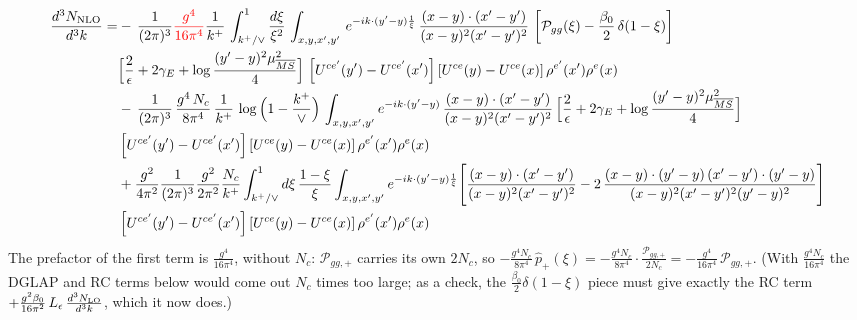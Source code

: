 \documentclass[9pt]{article}
\newcommand{\Leps}{L_{\epsilon}}
\numberwithin{equation}{section}
\begin{document}
\begin{align}\label{eq:pggform}
\frac{d^{3}N_{\rm NLO}}{d^{3}k}=&-\,\frac{1}{(2\pi)^{3}}{\color{red}\frac{g^{4}}{16\pi^{4}}}\frac{1}{k^{+}}\,\int_{k^{+}/\vee}^{1}\frac{d\xi}{\xi^{2}}\,\int_{x,y,x',y'}\,e^{-ik\cdot(y'-y)\frac{1}{\xi}}\,\frac{(x-y)\cdot(x'-y')}{(x-y)^{2}(x'-y')^{2}}\,\left[\mathcal{P}_{gg}(\xi)-\frac{\beta_{0}}{2}\,\delta(1-\xi)\right]\notag \\ & \Big[\frac{2}{\epsilon}+2\gamma_{E}+\log\frac{(y'-y)^{2}\mu^{2}_{\overline{MS}}}{4}\Big]\,\left[U^{ce'}(y')-U^{ce'}(x')\right]\left[U^{ce}(y)-U^{ce}(x)\right]\rho^{e'}(x')\rho^{e}(x)\notag\\&
-\,\frac{1}{(2\pi)^{3}}\,\frac{g^{4}\,N_{c}}{8\pi^{4}}\,\frac{1}{k^{+}}\,\log\Big(1-\frac{k^{+}}{\vee}\Big)\,\int_{x,y,x',y'}e^{-ik\cdot(y'-y)}\,\frac{(x-y)\cdot(x'-y')}{(x-y)^{2}(x'-y')^{2}}\,\Big[\frac{2}{\epsilon}+2\gamma_{E}+\log\frac{(y'-y)^{2}\mu^{2}_{\overline{MS}}}{4}\Big]\notag \\ & \left[U^{ce'}(y')-U^{ce'}(x')\right]\left[U^{ce}(y)-U^{ce}(x)\right]\rho^{e'}(x')\rho^{e}(x)\notag\\
&+\frac{g^{2}}{4\pi^{2}}\frac{1}{(2\pi)^{3}}\frac{g^{2}}{2\pi^{2}}\frac{N_{c}}{k^{+}}\int_{k^{+}/\vee}^{1}d\xi\,\frac{1-\xi}{\xi}\int_{x,y,x',y'}e^{-ik\cdot(y'-y)\frac{1}{\xi}}\Bigg[\frac{(x-y)\cdot(x'-y')}{(x-y)^{2}(x'-y')^{2}}-2\,\frac{(x-y)\cdot(y'-y)\,(x'-y')\cdot(y'-y)}{(x-y)^{2}(x'-y')^{2}(y'-y)^{2}}\Bigg]\notag \\ & \left[U^{ce'}(y')-U^{ce'}(x')\right]\left[U^{ce}(y)-U^{ce}(x)\right]\rho^{e'}(x')\rho^{e}(x)
\end{align}
{\color{red}The prefactor of the first term is $\frac{g^{4}}{16\pi^{4}}$, without $N_{c}$:
$\mathcal P_{gg,+}$ carries its own $2N_{c}$, so
$-\frac{g^{4}N_{c}}{8\pi^{4}}\,\hat p_{+}(\xi)=-\frac{g^{4}N_{c}}{8\pi^{4}}\cdot
\frac{\mathcal P_{gg,+}}{2N_{c}}=-\frac{g^{4}}{16\pi^{4}}\,\mathcal P_{gg,+}$. (With
$\frac{g^{4}N_{c}}{16\pi^{4}}$ the DGLAP and RC terms below would come out $N_{c}$ times too
large; as a check, the $\frac{\beta_{0}}{2}\delta(1-\xi)$ piece must give exactly the RC term
$+\frac{g^{2}\beta_{0}}{16\pi^{2}}\,\Leps\,\frac{d^{3}N_{\rm LO}}{d^{3}k}$, which it now does.)}
\end{document}
